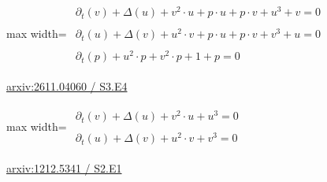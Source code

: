 \documentclass[10pt,a4paper]{article}
\begin{document}
\begin{minipage}{\linewidth}
\begin{center}\begin{adjustbox}{max width=\linewidth}$\displaystyle\begin{gathered}\begin{gathered}\partial_{t}(v)+\Delta(u)+v^{2}\cdot u+p\cdot u+p\cdot v+u^{3}+v=0\end{gathered}\\[5pt]\begin{gathered}\partial_{t}(u)+\Delta(v)+u^{2}\cdot v+p\cdot u+p\cdot v+v^{3}+u=0\end{gathered}\\[5pt]\begin{gathered}\partial_{t}(p)+u^{2}\cdot p+v^{2}\cdot p+1+p=0\end{gathered}\end{gathered}$\end{adjustbox}\end{center}
{\small \href{https://arxiv.org/html/2611.04060#S3.E4}{arxiv:2611.04060 / S3.E4}}\par
\end{minipage}\par\vspace{7mm}

\begin{minipage}{\linewidth}
\begin{center}\begin{adjustbox}{max width=\linewidth}$\displaystyle\begin{gathered}\begin{gathered}\partial_{t}(v)+\Delta(u)+v^{2}\cdot u+u^{3}=0\end{gathered}\\[5pt]\begin{gathered}\partial_{t}(u)+\Delta(v)+u^{2}\cdot v+v^{3}=0\end{gathered}\end{gathered}$\end{adjustbox}\end{center}
{\small \href{https://arxiv.org/html/1212.5341#S2.E1}{arxiv:1212.5341 / S2.E1}}\par
\end{minipage}\par\vspace{7mm}
\end{document}

